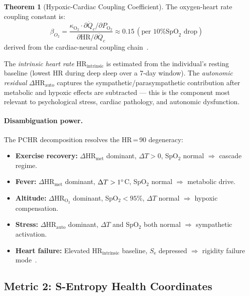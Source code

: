 \documentclass[10pt,twocolumn,a4paper]{article}
\theoremstyle{definition}
\newtheorem{theorem}{Theorem}
\newcommand{\SE}{S_{\text{e}}}
\begin{document}
\begin{theorem}[Hypoxic-Cardiac Coupling Coefficient]
\label{thm:beta_o2}
The oxygen-heart rate coupling constant is:
\begin{equation}
\beta_{O_2} = \frac{\kappa_{\text{O}_2} \cdot
\partial\dot{Q}_c / \partial P_{\text{O}_2}}
{\partial\text{HR}/\partial\dot{Q}_c}
\approx 0.15\,(\text{per 10\% SpO}_2\text{ drop})
\end{equation}
derived from the cardiac-neural coupling
chain~\cite{sachikonye2024integration}.
\end{theorem}

The \emph{intrinsic heart rate} $\text{HR}_{\text{intrinsic}}$ is
estimated from the individual's resting baseline (lowest HR during
deep sleep over a 7-day window). The \emph{autonomic residual}
$\Delta\text{HR}_{\text{auto}}$ captures the sympathetic/parasympathetic
contribution after metabolic and hypoxic effects are subtracted ---
this is the component most relevant to psychological stress, cardiac
pathology, and autonomic dysfunction.

\paragraph{Disambiguation power.}
The PCHR decomposition resolves the HR\,=\,90 degeneracy:
\begin{itemize}[leftmargin=*,nosep]
\item \textbf{Exercise recovery:} $\Delta\text{HR}_{\text{met}}$ dominant,
  $\Delta T > 0$, SpO$_2$ normal $\Rightarrow$ cascade regime.
\item \textbf{Fever:} $\Delta\text{HR}_{\text{met}}$ dominant,
  $\Delta T > 1\degree$C, SpO$_2$ normal $\Rightarrow$ metabolic drive.
\item \textbf{Altitude:} $\Delta\text{HR}_{\text{O}_2}$ dominant,
  SpO$_2 < 95\%$, $\Delta T$ normal $\Rightarrow$ hypoxic compensation.
\item \textbf{Stress:} $\Delta\text{HR}_{\text{auto}}$ dominant,
  $\Delta T$ and SpO$_2$ both normal $\Rightarrow$ sympathetic activation.
\item \textbf{Heart failure:} Elevated $\text{HR}_{\text{intrinsic}}$
  baseline, $\SE$ depressed $\Rightarrow$ rigidity failure
  mode~\cite{goldberger2002fractal}.
\end{itemize}

\subsection{Metric 2: S-Entropy Health Coordinates}
\end{document}
